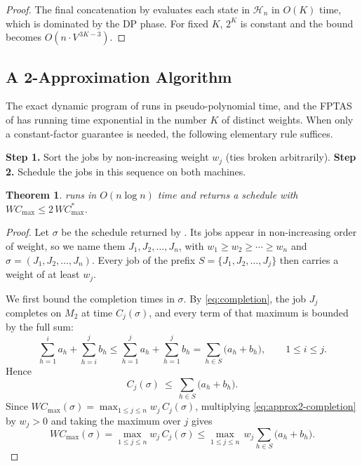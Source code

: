 \documentclass[12pt]{article}
\newtheorem{theorem}{Theorem}[section]
\let\origsubsection\subsection
\renewcommand{\subsection}{\FloatBarrier\origsubsection}
\begin{document}
\begin{sloppypar}
\begin{proof}
The final concatenation by  evaluates each state in
$\mathscr{H}_{n}$ in $O(K)$ time, which is dominated by the DP phase. For fixed $K$, $2^K$ is
constant and the bound becomes $O(n \cdot V^{\,3K-3})$.
\end{proof}






\subsection{A 2-Approximation Algorithm}
\label{sub:approx2}

The exact dynamic program of  runs in pseudo-polynomial
time, and the FPTAS of  has running time exponential in the
number $K$ of distinct weights. When only a constant-factor guarantee is needed, the
following elementary rule suffices.

\begin{algorithm}[tbp]
\small
\linespread{1.2}\selectfont
\SetAlgoLined
\DontPrintSemicolon
\caption{2-Approximation for $F2 \parallel W C_{\max}$}\label{alg:approx2}
\BlankLine
\textbf{Step 1.} Sort the jobs by non-increasing weight $w_j$ (ties broken arbitrarily). \;
\textbf{Step 2.} Schedule the jobs in this sequence on both machines. \;
\end{algorithm}

\begin{theorem}\label{thm:approx2}
 runs in $O(n\log n)$ time and returns a schedule with
$W C_{\max}\le 2\,W C_{\max}^{*}$.
\end{theorem}

\begin{proof}
Let $\sigma$ be the schedule returned by . Its jobs appear in non-increasing
order of weight, so we name them $J_1,J_2,\dots,J_n$, with $w_1\ge w_2\ge\cdots\ge w_n$ and
$\sigma=(J_1,J_2,\dots,J_n)$. Every job of the prefix $S=\{J_1,J_2,\dots,J_j\}$ then carries
a weight of at least $w_j$.

We first bound the completion times in $\sigma$. By \cref{eq:completion}, the job $J_j$
completes on $M_2$ at time $C_j(\sigma)$, and every term of that maximum is bounded by the
full sum:
\[
\sum_{h=1}^{i}a_h+\sum_{h=i}^{j}b_h
\le \sum_{h=1}^{j}a_h+\sum_{h=1}^{j}b_h
= \sum_{h\in S}\bigl(a_h+b_h\bigr),
\qquad 1\le i\le j.
\]
Hence
\begin{equation}\label{eq:approx2-completion}
C_j(\sigma)\ \le\ \sum_{h\in S}\bigl(a_h+b_h\bigr).
\end{equation}
Since $W C_{\max}(\sigma)=\max_{1\le j\le n}w_j\,C_j(\sigma)$, multiplying \cref{eq:approx2-completion}
by $w_j>0$ and taking the maximum over $j$ gives
\begin{equation}\label{eq:approx2-upper}
W C_{\max}(\sigma)=\max_{1\le j\le n}w_j\,C_j(\sigma)
\le \max_{1\le j\le n}\,w_j\sum_{h\in S}\bigl(a_h+b_h\bigr).
\end{equation}


\end{proof}
\end{sloppypar}
\end{document}
